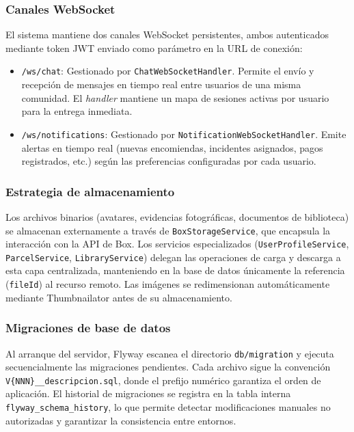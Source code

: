\subsubsection*{Canales WebSocket}

El sistema mantiene dos canales WebSocket persistentes, ambos autenticados mediante token JWT enviado como parámetro en la URL de conexión:

\begin{itemize}
    \item \texttt{/ws/chat}: Gestionado por \texttt{ChatWebSocketHandler}. Permite el envío y recepción de mensajes en tiempo real entre usuarios de una misma comunidad. El \textit{handler} mantiene un mapa de sesiones activas por usuario para la entrega inmediata.
    \item \texttt{/ws/notifications}: Gestionado por \texttt{NotificationWebSocketHandler}. Emite alertas en tiempo real (nuevas encomiendas, incidentes asignados, pagos registrados, etc.) según las preferencias configuradas por cada usuario.
\end{itemize}

\subsubsection*{Estrategia de almacenamiento}

Los archivos binarios (avatares, evidencias fotográficas, documentos de biblioteca) se almacenan externamente a través de \texttt{BoxStorageService}, que encapsula la interacción con la API de Box. Los servicios especializados (\texttt{UserProfileService}, \texttt{ParcelService}, \texttt{LibraryService}) delegan las operaciones de carga y descarga a esta capa centralizada, manteniendo en la base de datos únicamente la referencia (\texttt{fileId}) al recurso remoto. Las imágenes se redimensionan automáticamente mediante Thumbnailator antes de su almacenamiento.

\subsubsection*{Migraciones de base de datos}

Al arranque del servidor, Flyway escanea el directorio \texttt{db/migration} y ejecuta secuencialmente las migraciones pendientes. Cada archivo sigue la convención \texttt{V\{NNN\}\_\_descripcion.sql}, donde el prefijo numérico garantiza el orden de aplicación. El historial de migraciones se registra en la tabla interna \texttt{flyway\_schema\_history}, lo que permite detectar modificaciones manuales no autorizadas y garantizar la consistencia entre entornos.


